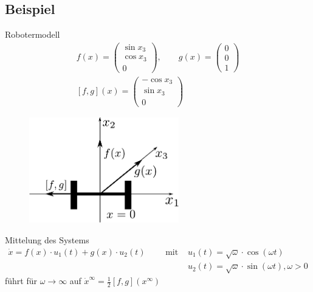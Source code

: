 \documentclass[ngerman]{tudscrreprt}
\begin{document}
\subsection*{Beispiel}
Robotermodell
\begin{align*}
f(x) = \begin{pmatrix} \sin{x_3} \\ \cos{x_3}\\ 0 \end{pmatrix}, \qquad g(x) = \begin{pmatrix} 0\\ 0\\ 1\end{pmatrix} \\ 
[f,g](x) = \begin{pmatrix} -\cos{x_3}\\ \sin{x_3}\\ 0 \end{pmatrix}
\end{align*}
\begin{figure}[H]
\centering
\def\svgwidth{200pt} 
  \includegraphics[width=6.5cm]{robmod1.pdf}
\end{figure}
Mittelung des Systems 
\begin{align*}
\dot x = f(x)\cdot u_1(t) + g(x)\cdot u_2(t) \qquad \text{ mit } &u_1(t)= \sqrt{\omega}\cdot \cos{(\omega t)}\\ 
&u_2(t) = \sqrt{\omega}\cdot \sin{(\omega t)}, \omega > 0
\end{align*}
führt für $\omega \to \infty$ auf $\dot x^\infty = \frac{1}{2} [f,g] (x^\infty)$
\end{document}
